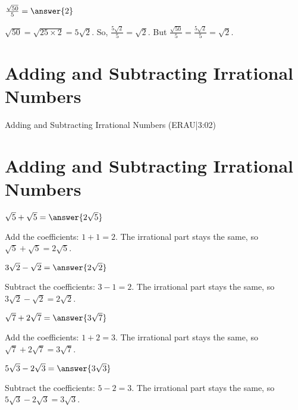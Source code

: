 \documentclass{ximera}
\begin{document}
\begin{problem}
$\frac{\sqrt{50}}{5} = \answer{2}$

\begin{feedback}
$\sqrt{50} = \sqrt{25 \times 2} = 5\sqrt{2}$. So, $\frac{5\sqrt{2}}{5} = \sqrt{2}$. But $\frac{\sqrt{50}}{5} = \frac{5\sqrt{2}}{5} = \sqrt{2}$.
\end{feedback}
\end{problem}

\section*{Adding and Subtracting Irrational Numbers}

Adding and Subtracting Irrational Numbers (ERAU|3:02)


\section*{Adding and Subtracting Irrational Numbers}

\begin{problem}
$\sqrt{5} + \sqrt{5} = \answer{2\sqrt{5}}$

\begin{feedback}
Add the coefficients: $1 + 1 = 2$. The irrational part stays the same, so $\sqrt{5} + \sqrt{5} = 2\sqrt{5}$.
\end{feedback}
\end{problem}

\begin{problem}
$3\sqrt{2} - \sqrt{2} = \answer{2\sqrt{2}}$

\begin{feedback}
Subtract the coefficients: $3 - 1 = 2$. The irrational part stays the same, so $3\sqrt{2} - \sqrt{2} = 2\sqrt{2}$.
\end{feedback}
\end{problem}

\begin{problem}
$\sqrt{7} + 2\sqrt{7} = \answer{3\sqrt{7}}$

\begin{feedback}
Add the coefficients: $1 + 2 = 3$. The irrational part stays the same, so $\sqrt{7} + 2\sqrt{7} = 3\sqrt{7}$.
\end{feedback}
\end{problem}

\begin{problem}
$5\sqrt{3} - 2\sqrt{3} = \answer{3\sqrt{3}}$

\begin{feedback}
Subtract the coefficients: $5 - 2 = 3$. The irrational part stays the same, so $5\sqrt{3} - 2\sqrt{3} = 3\sqrt{3}$.
\end{feedback}
\end{problem}
\end{document}
